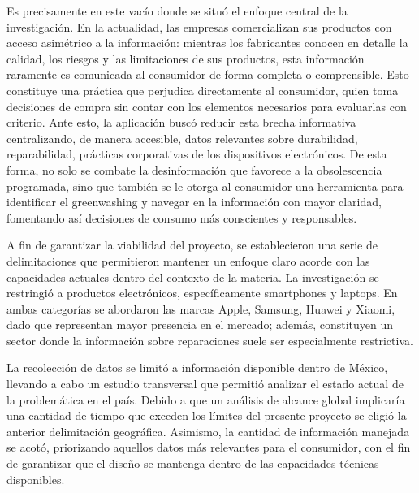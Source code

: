 Es precisamente en este vacío donde se situó el enfoque central de la
investigación. En la actualidad, las empresas comercializan sus productos con
acceso asimétrico a la información: mientras los fabricantes conocen en detalle
la calidad, los riesgos y las limitaciones de sus productos, esta información
raramente es comunicada al consumidor de forma completa o comprensible. Esto
constituye una práctica que perjudica directamente al consumidor, quien toma
decisiones de compra sin contar con los elementos necesarios para evaluarlas con
criterio. Ante esto, la aplicación buscó reducir esta brecha
informativa centralizando, de manera accesible, datos relevantes sobre
durabilidad, reparabilidad, prácticas corporativas de los dispositivos
electrónicos. De esta forma, no solo se combate la desinformación que favorece a
la obsolescencia programada, sino que también se le otorga al consumidor una
herramienta para identificar el greenwashing y navegar en la información con mayor
claridad, fomentando así decisiones de consumo más conscientes y responsables. 

A fin de garantizar la viabilidad del proyecto, se establecieron una serie de
delimitaciones que permitieron mantener un enfoque claro acorde con las
capacidades actuales dentro del contexto de la materia. La investigación se
restringió a productos electrónicos, específicamente smartphones y laptops. En
ambas categorías se abordaron las marcas Apple, Samsung, Huawei y Xiaomi, dado
que representan mayor presencia en el mercado; además, constituyen un sector
donde la información sobre reparaciones suele ser especialmente restrictiva. 

La recolección de datos se limitó a información disponible dentro de
México, llevando a cabo un estudio transversal que permitió analizar el estado
actual de la problemática en el país. Debido a que un análisis de alcance global
implicaría una cantidad de tiempo que exceden los límites del presente proyecto
se eligió la anterior delimitación geográfica. Asimismo, la cantidad de
información manejada se acotó, priorizando aquellos datos más relevantes
para el consumidor, con el fin de garantizar que el diseño se mantenga dentro de
las capacidades técnicas disponibles. 
